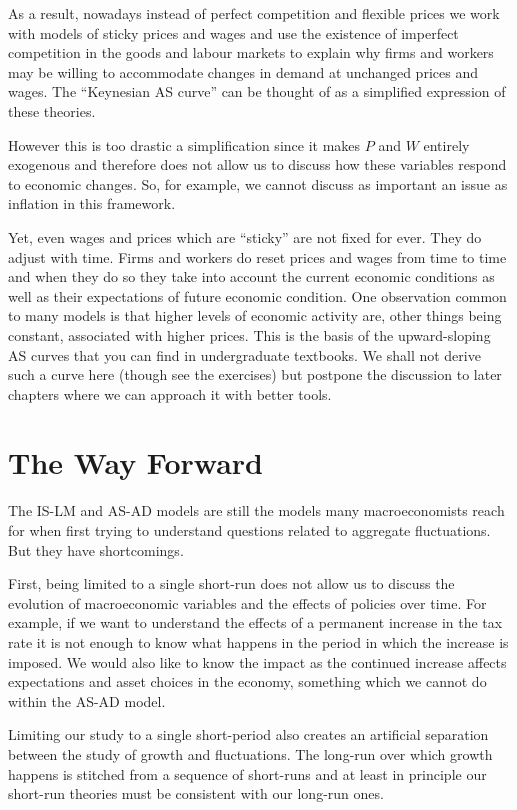 \documentclass[11pt,reqno,openany]{amsbook}
\begin{document}
As a result, nowadays instead of perfect competition and
flexible prices we work with models of sticky prices and
wages and use
the existence of imperfect competition in the goods and
labour markets to explain why firms and workers may be
willing to accommodate changes in demand at unchanged prices
and wages. The ``Keynesian AS curve'' can be thought of as a
simplified expression of these theories.

However this is too drastic a simplification since it makes
$P$ and $W$ entirely exogenous and therefore does not allow
us to discuss how these variables respond to economic
changes. So, for example, we cannot discuss as important an
issue as inflation in this framework.

Yet, even wages and prices which are ``sticky'' are not
fixed for ever. They do adjust with time. Firms and workers
do reset prices and wages from time to time and when they do
so they take into account the current economic conditions as
well as their expectations of future economic condition. One
observation common to many models is that higher levels of
economic activity are, other things being constant,
associated with higher prices. This is the basis of the
upward-sloping AS curves that you can find in undergraduate
textbooks. We shall not derive such a curve here (though see
the exercises) but postpone the discussion to later chapters
where we can approach it with better tools.

\section{The Way Forward}
The IS-LM and AS-AD models are still the models many
macroeconomists reach for when first trying to understand
questions related to aggregate fluctuations. But they have
shortcomings. 

First, being limited to a single short-run does not allow us
to discuss the evolution of macroeconomic variables and the
effects of policies over time. For example, if we want to
understand the effects of a permanent increase in the tax
rate it is not enough to know what happens in the period in
which the increase is imposed. We would also like to know
the impact as the continued increase affects expectations
and asset choices in the economy, something which we cannot
do within the AS-AD model. 

Limiting our study to a
single short-period  also creates an
artificial separation between the study of growth and
fluctuations. The long-run over which growth happens is
stitched from a sequence of short-runs and at least in
principle our short-run theories must be consistent with our
long-run ones.
\end{document}
